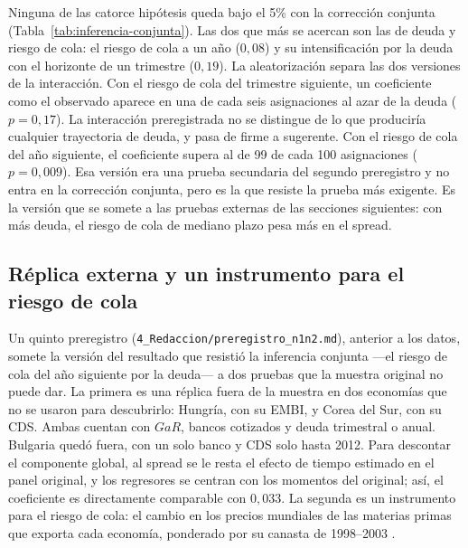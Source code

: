Ninguna de las catorce hipótesis queda bajo el 5\% con la corrección conjunta (Tabla~\ref{tab:inferencia-conjunta}). Las dos que más se acercan son las de deuda y riesgo de cola: el riesgo de cola a un año ($0{,}08$) y su intensificación por la deuda con el horizonte de un trimestre ($0{,}19$). La aleatorización separa las dos versiones de la interacción. Con el riesgo de cola del trimestre siguiente, un coeficiente como el observado aparece en una de cada seis asignaciones al azar de la deuda ($p=0{,}17$). La interacción preregistrada no se distingue de lo que produciría cualquier trayectoria de deuda, y pasa de firme a sugerente. Con el riesgo de cola del año siguiente, el coeficiente supera al de 99 de cada 100 asignaciones ($p=0{,}009$). Esa versión era una prueba secundaria del segundo preregistro y no entra en la corrección conjunta, pero es la que resiste la prueba más exigente. Es la versión que se somete a las pruebas externas de las secciones siguientes: con más deuda, el riesgo de cola de mediano plazo pesa más en el spread.

\subsection{Réplica externa y un instrumento para el riesgo de cola}
\label{sec:n1n2}

Un quinto preregistro (\texttt{4\_Redaccion/preregistro\_n1n2.md}), anterior a los datos, somete la versión del resultado que resistió la inferencia conjunta ---el riesgo de cola del año siguiente por la deuda--- a dos pruebas que la muestra original no puede dar. La primera es una réplica fuera de la muestra en dos economías que no se usaron para descubrirlo: Hungría, con su EMBI, y Corea del Sur, con su CDS. Ambas cuentan con $GaR$, bancos cotizados y deuda trimestral o anual. Bulgaria quedó fuera, con un solo banco y CDS solo hasta 2012. Para descontar el componente global, al spread se le resta el efecto de tiempo estimado en el panel original, y los regresores se centran con los momentos del original; así, el coeficiente es directamente comparable con $0{,}033$. La segunda es un instrumento para el riesgo de cola: el cambio en los precios mundiales de las materias primas que exporta cada economía, ponderado por su canasta de 1998--2003 \citep{Gruss2014}.

